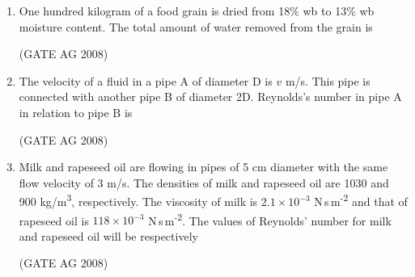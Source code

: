 \documentclass[journal]{IEEEtran}
\begin{document}
\begin{enumerate}
\medskip

\item 
 One hundred kilogram of a food grain is dried from 18\% wb to 13\% wb moisture content. The total amount of water removed from the grain is
\begin{enumerate}
\end{enumerate}
\hfill(GATE AG 2008)\\

\medskip

\item 
 The velocity of a fluid in a pipe A of diameter D is $v$ m/s. This pipe is connected with another pipe B of diameter 2D. Reynolds's number in pipe A in relation to pipe B is
\begin{enumerate}
\end{enumerate}
\hfill(GATE AG 2008)\\

\medskip

\item 
 Milk and rapeseed oil are flowing in pipes of 5 cm diameter with the same flow velocity of 3 m/s. The densities of milk and rapeseed oil are 1030 and 900 kg/m\textsuperscript{3}, respectively. The viscosity of milk is $2.1 \times 10^{-3}$ N\,s\,m\textsuperscript{-2} and that of rapeseed oil is $118 \times 10^{-3}$ N\,s\,m\textsuperscript{-2}. The values of Reynolds' number for milk and rapeseed oil will be respectively
\begin{enumerate}
\end{enumerate}
\hfill(GATE AG 2008)\\


\end{enumerate}
\end{document}
